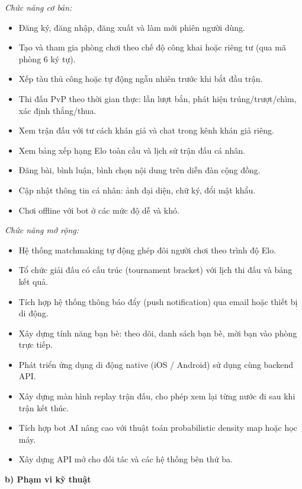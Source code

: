 \documentclass[13pt, a4paper]{extreport}
\begin{document}
\textit{Chức năng cơ bản:}
\begin{itemize}
  \item Đăng ký, đăng nhập, đăng xuất và làm mới phiên người dùng.
  \item Tạo và tham gia phòng chơi theo chế độ công khai hoặc riêng tư (qua mã phòng 6 ký tự).
  \item Xếp tàu thủ công hoặc tự động ngẫu nhiên trước khi bắt đầu trận.
  \item Thi đấu PvP theo thời gian thực: lần lượt bắn, phát hiện trúng/trượt/chìm, xác định thắng/thua.
  \item Xem trận đấu với tư cách khán giả và chat trong kênh khán giả riêng.
  \item Xem bảng xếp hạng Elo toàn cầu và lịch sử trận đấu cá nhân.
  \item Đăng bài, bình luận, bình chọn nội dung trên diễn đàn cộng đồng.
  \item Cập nhật thông tin cá nhân: ảnh đại diện, chữ ký, đổi mật khẩu.
  \item Chơi offline với bot ở các mức độ dễ và khó.
\end{itemize}

\textit{Chức năng mở rộng:}
\begin{itemize}
  \item Hệ thống matchmaking tự động ghép đôi người chơi theo trình độ Elo.
  \item Tổ chức giải đấu có cấu trúc (tournament bracket) với lịch thi đấu và bảng kết quả.
  \item Tích hợp hệ thống thông báo đẩy (push notification) qua email hoặc thiết bị di động.
  \item Xây dựng tính năng bạn bè: theo dõi, danh sách bạn bè, mời bạn vào phòng trực tiếp.
  \item Phát triển ứng dụng di động native (iOS / Android) sử dụng cùng backend API.
  \item Xây dựng màn hình replay trận đấu, cho phép xem lại từng nước đi sau khi trận kết thúc.
  \item Tích hợp bot AI nâng cao với thuật toán probabilistic density map hoặc học máy.
  \item Xây dựng API mở cho đối tác và các hệ thống bên thứ ba.
\end{itemize}

\textbf{b) Phạm vi kỹ thuật}
\end{document}
